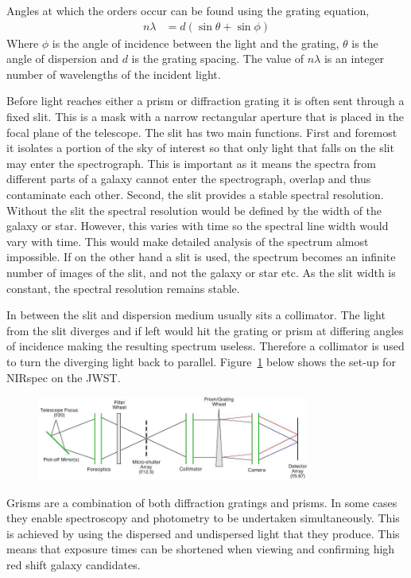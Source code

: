	Angles at which the orders occur can be found using the grating equation,
	\begin{align}
		n\lambda &= d(\sin\theta + \sin\phi)
	\end{align}
	Where $\phi$ is the angle of incidence between the light and the grating, $\theta$ is the angle of dispersion and $d$ is the grating spacing. The value of $n\lambda$ is an integer number of wavelengths of the incident light.

	Before light reaches either a prism or diffraction grating it is often sent through a fixed slit. This is a mask with a narrow rectangular aperture that is placed in the focal plane of the telescope. The slit has two main functions. First and foremost it isolates a portion of the sky of interest so that only light that falls on the slit may enter the spectrograph. This is important as it means the spectra from different parts of a galaxy cannot enter the spectrograph, overlap and thus contaminate each other. Second, the slit provides a stable spectral resolution. Without the slit the spectral resolution would be defined by the width of the galaxy or star. However, this varies with time so the spectral line width would vary with time. This would make detailed analysis of the spectrum almost impossible. If on the other hand a slit is used, the spectrum becomes an infinite number of images of the slit, and not the galaxy or star etc. As the slit width is constant, the spectral resolution remains stable.

	In between the slit and dispersion medium usually sits a collimator. The light from the slit diverges and if left would hit the grating or prism at differing angles of incidence making the resulting spectrum useless. Therefore a collimator is used to turn the diverging light back to parallel. Figure~\ref{fig:nirspec_jwst} below shows the set-up for NIRspec on the JWST.
	\begin{figure}[!htbp]
		\centering
			\includegraphics[width=0.8\textwidth]{../Images/nirspec_jwst.jpeg}
		\caption{\label{fig:nirspec_jwst}}
	\end{figure}

	Grisms are a combination of both diffraction gratings and prisms. In some cases they enable spectroscopy and photometry to be undertaken simultaneously. This is achieved by using the dispersed and undispersed light that they produce. This means that exposure times can be shortened when viewing and confirming high red shift galaxy candidates.

